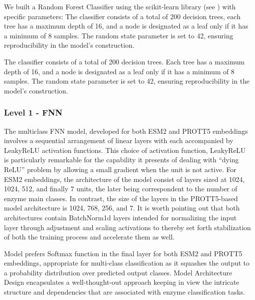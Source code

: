 \documentclass{bioinfo}
\begin{document}
\begin{methods}
We built a Random Forest Classifier using the scikit-learn library (see \cite{scikit-learn}) with specific parameters: 
The classifier consists of a total of 200 decision trees, each tree has a
maximum depth of 16, and a node is designated as a leaf only if it has a
minimum of 8 samples. The random state parameter is set to 42, ensuring
reproducibility in the model’s construction.


The classifier consists of a total of 200 decision trees.
Each tree has a maximum depth of 16, and a node is designated as a leaf only if it has a minimum of 8 samples.
The random state parameter is set to 42, ensuring reproducibility in the model's construction.
\subsubsection{Level 1 - FNN}
The multiclass FNN model, developed for both ESM2 and PROTT5 embeddings involves a sequential arrangement of linear layers with each accompanied by LeakyReLU activation functions.
This choice of activation function, LeakyReLU is particularly remarkable for the capability it presents of dealing with “dying ReLU”%
problem by allowing a small gradient when the unit is not active. 
For ESM2 embeddings, the architecture of the model consist of layers sized at 1024, 1024, 512, and finally 7 units, the later being correspondent 
to the number of enzyme main classes. In contrast, the size of the layers in the PROTT5-based model architecture is 1024, 768, 256, and 7.
It is worth pointing out that both architectures contain BatchNorm1d layers intended for normalizing the input layer through adjustment
and scaling activations to thereby set 
forth stabilization of both the training process and accelerate them as well.

Model prefers Softmax function in the final layer for both ESM2 and PROTT5 embeddings, %
appropriate for multi-class classification as it squashes the output to a probability distribution over predicted output classes.
Model Architecture Design encapsulates a well-thought-out approach keeping in view the intricate structure and dependencies that 
are associated with enzyme classification tasks.


\end{methods}
\end{document}
